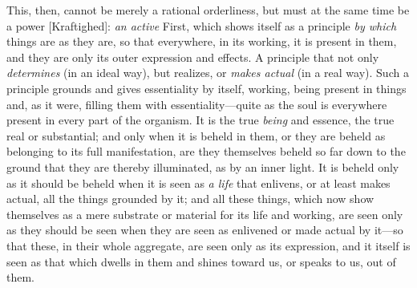 \documentclass[12pt,a4paper]{book}
\begin{document}
This, then, cannot be merely a rational orderliness, but must at the same time be a
power [Kraftighed]: \emph{an active} First, which shows itself as a principle
\emph{by which} things are as they are, so that everywhere, in its working, it is
present in them, and they are only its outer expression and effects. A principle
that not only \emph{determines} (in an ideal way), but realizes, or \emph{makes
actual} (in a real way). Such a principle grounds and gives essentiality by itself,
working, being present in things and, as it were, filling them with
essentiality---quite as the soul is everywhere present in every part of the
organism. It is the true \emph{being} and essence, the true real or substantial;
and only when it is beheld in them, or they are beheld as belonging to its full
manifestation, are they themselves beheld so far down to the ground that they are
thereby illuminated, as by an inner light. It is beheld only as it should be beheld
when it is seen as \emph{a life} that enlivens, or at least makes actual, all the
things grounded by it; and all these things, which now show themselves as a mere
substrate or material for its life and working, are seen only as they should be seen
when they are seen as enlivened or made actual by it---so that these, in their whole
aggregate, are seen only as its expression, and it itself is seen as that which
dwells in them and shines toward us, or speaks to us, out of them.
\end{document}

